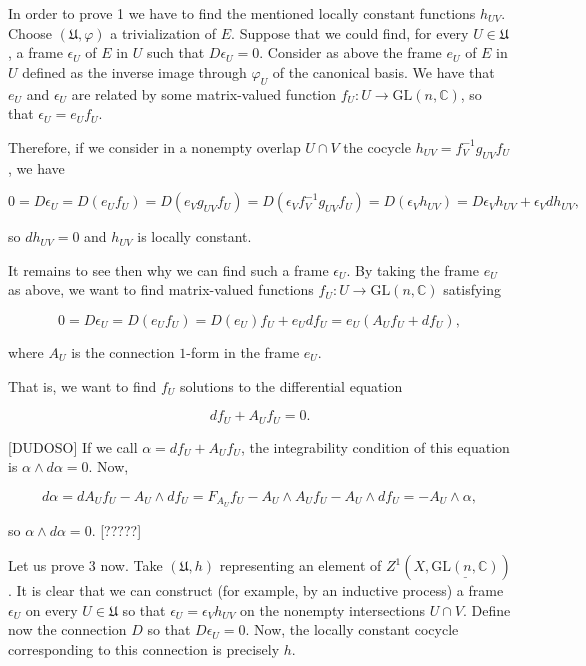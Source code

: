 \documentclass[]{article}
\begin{document}
In order to prove 1 we have to find the mentioned locally constant
functions \(h_{UV}\). Choose \((\mathfrak{U},\varphi)\) a trivialization
of \(E\). Suppose that we could find, for every \(U\in \mathfrak{U}\), a
frame \(\epsilon_U\) of \(E\) in \(U\) such that \(D \epsilon_U = 0\).
Consider as above the frame \(e_U\) of \(E\) in \(U\) defined as the
inverse image through \(\varphi_U\) of the canonical basis. We have that
\(e_U\) and \(\epsilon_U\) are related by some matrix-valued function
\(f_U:U \rightarrow \mathrm{GL}(n,\mathbb{C})\), so that
\(\epsilon_U = e_U f_U\).

Therefore, if we consider in a nonempty overlap \(U\cap V\) the cocycle
\(h_{UV}= f_V^{-1} g_{UV} f_U\), we have

\[
0 = D \epsilon_U = D (e_U f_U) = D (e_V g_{UV} f_U) = D(\epsilon_V f_V^{-1} g_{UV} f_U) = D(\epsilon_V h_{UV}) = D \epsilon_V h_{UV} + \epsilon_V dh_{UV},
\]

so \(dh_{UV}=0\) and \(h_{UV}\) is locally constant.

It remains to see then why we can find such a frame \(\epsilon_U\). By
taking the frame \(e_U\) as above, we want to find matrix-valued
functions \(f_U: U \rightarrow \mathrm{GL}(n,\mathbb{C})\) satisfying

\[
0= D\epsilon_U = D(e_U f_U) = D(e_U) f_U + e_U df_U = e_U (A_U f_U + df_U),
\]

where \(A_U\) is the connection \(1\)-form in the frame \(e_U\).

That is, we want to find \(f_U\) solutions to the differential equation

\[
df_U + A_U f_U = 0.
\]

{[}DUDOSO{]} If we call \(\alpha= df_U + A_U f_U\), the integrability
condition of this equation is \(\alpha \wedge d\alpha = 0\). Now,

\[
d\alpha = dA_U f_U - A_U \wedge df_U = F_{A_U} f_U - A_U \wedge A_U f_U - A_U \wedge df_U=-A_U \wedge \alpha,
\]

so \(\alpha \wedge d\alpha = 0\). {[}?????{]}

Let us prove 3 now. Take \((\mathfrak{U},h)\) representing an element of
\(Z^1(X,\underline{\mathrm{GL}(n,\mathbb{C})})\). It is clear that we
can construct (for example, by an inductive process) a frame
\(\epsilon_U\) on every \(U\in \mathfrak{U}\) so that
\(\epsilon_U = \epsilon_V h_{UV}\) on the nonempty intersections
\(U\cap V\). Define now the connection \(D\) so that
\(D\epsilon_U = 0\). Now, the locally constant cocycle corresponding to
this connection is precisely \(h\).
\end{document}
